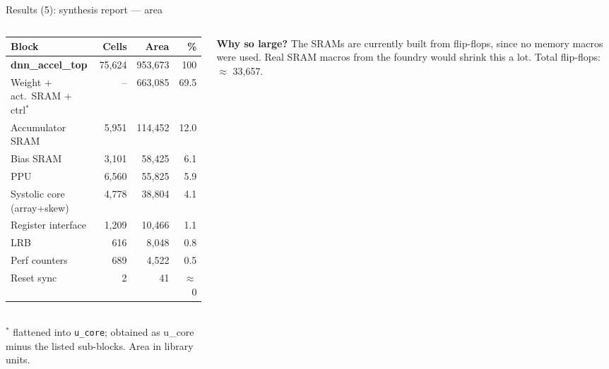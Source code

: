 \documentclass[aspectratio=169,10pt,t]{beamer}
\begin{document}
\begin{frame}{Results (5): synthesis report --- area}
  \begin{columns}[T]
    \begin{column}{0.5\textwidth}
      \footnotesize
      \renewcommand{\arraystretch}{1.12}
      \begin{tabular}{@{}lrrr@{}}
        \toprule
        \textbf{Block} & \textbf{Cells} & \textbf{Area} & \textbf{\%}\\
        \midrule
        \textbf{dnn\_accel\_top} & 75,624 & 953,673 & 100\\
        \quad Weight + act.\ SRAM + ctrl$^{*}$ & -- & 663,085 & 69.5\\
        \quad Accumulator SRAM & 5,951 & 114,452 & 12.0\\
        \quad Bias SRAM & 3,101 & 58,425 & 6.1\\
        \quad PPU & 6,560 & 55,825 & 5.9\\
        \quad Systolic core (array+skew) & 4,778 & 38,804 & 4.1\\
        \quad Register interface & 1,209 & 10,466 & 1.1\\
        \quad LRB & 616 & 8,048 & 0.8\\
        \quad Perf counters & 689 & 4,522 & 0.5\\
        \quad Reset sync & 2 & 41 & $\approx$0\\
        \bottomrule
      \end{tabular}\\[2pt]
      \tiny $^{*}$ flattened into \texttt{u\_core}; obtained as u\_core minus the listed sub-blocks. Area in library units.
    \end{column}
    \begin{column}{0.48\textwidth}
      \centering

      \footnotesize\textbf{Why so large?} The SRAMs are currently built from flip-flops, since no memory macros were used. Real SRAM macros from the foundry would shrink this a lot.
      Total flip-flops: $\approx$ 33,657.
    \end{column}
  \end{columns}
\end{frame}
\end{document}
